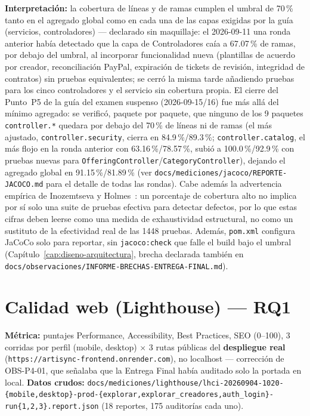\textbf{Interpretación:} la cobertura de líneas y de ramas cumplen el
umbral de 70\,\% tanto en el agregado global como en cada una de las
capas exigidas por la guía (servicios, controladores) --- declarado sin
maquillaje: el 2026-09-11 una ronda anterior había detectado que la capa
de Controladores caía a 67.07\,\% de ramas, por debajo del umbral, al
incorporar funcionalidad nueva (plantillas de acuerdo por creador,
reconciliación PayPal, expiración de tickets de revisión, integridad de
contratos) sin pruebas equivalentes; se cerró la misma tarde añadiendo
pruebas para los cinco controladores y el servicio sin cobertura propia.
El cierre del Punto~P5 de la guía del examen suspenso (2026-09-15/16) fue
más allá del mínimo agregado: se verificó, paquete por paquete, que
ninguno de los 9 paquetes \texttt{controller.*} quedara por debajo del
70\,\% de líneas ni de ramas (el más ajustado, \texttt{controller.security},
cierra en 84.9\,\%/89.3\,\%; \texttt{controller.catalog}, el más flojo en
la ronda anterior con 63.16\,\%/78.57\,\%, subió a 100.0\,\%/92.9\,\% con
pruebas nuevas para \texttt{OfferingController}/\texttt{CategoryController}),
dejando el agregado global en 91.15\,\%/81.89\,\% (ver
\texttt{docs/mediciones/jacoco/REPORTE-JACOCO.md} para el detalle de todas
las rondas). Cabe además la advertencia empírica de Inozemtseva y
Holmes~\cite{INOZEMTSEVA2014}: un porcentaje de cobertura alto no implica
por sí solo una suite de pruebas efectiva para detectar defectos, por lo
que estas cifras deben leerse como una medida de exhaustividad
estructural, no como un sustituto de la efectividad real de las 1448
pruebas. Además, \texttt{pom.xml} configura JaCoCo solo para
reportar, sin \texttt{jacoco:check} que falle el build bajo el umbral
(Capítulo~\ref{cap:diseno-arquitectura}, brecha declarada también en
\texttt{docs/observaciones/INFORME-BRECHAS-ENTREGA-FINAL.md}).

\section{Calidad web (Lighthouse) --- RQ1}

\textbf{Métrica:} puntajes Performance, Accessibility, Best Practices, SEO
(0--100), 3 corridas por perfil (mobile, desktop) $\times$ 3 rutas
públicas del \textbf{despliegue real}
(\texttt{https://artisync-frontend.onrender.com}), no localhost ---
corrección de OBS-P4-01, que señalaba que la Entrega Final había
auditado solo la portada en local. \textbf{Datos crudos:}
\texttt{docs/mediciones/lighthouse/lhci-20260904-1020-\{mobile,desktop\}-prod-\{explorar,explorar\_creadores,auth\_login\}-run\{1,2,3\}.report.json}
(18 reportes, 175 auditorías cada uno).

